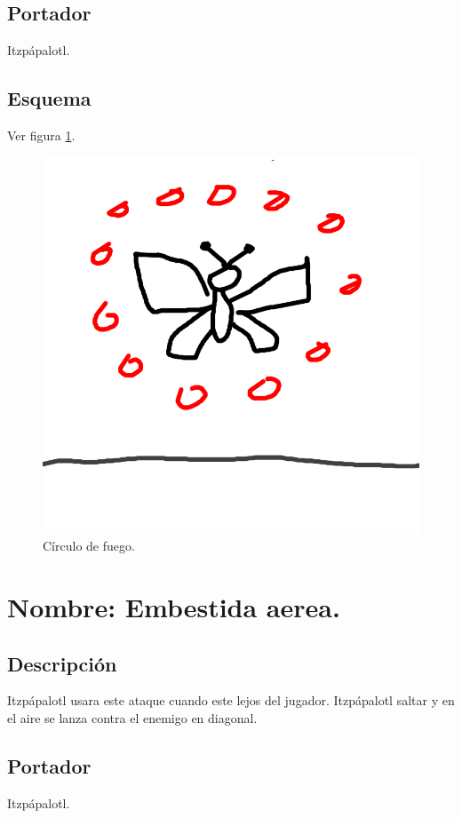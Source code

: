 \subsection{Portador}
Itzpápalotl. 
\subsection{Esquema}
			Ver figura \ref{fig:circuloF}.
			\begin{figure}
				\centering
				\includegraphics[height=0.2 \textheight]{Imagenes/circuloF}
				\caption{Círculo de fuego.}
				\label{fig:circuloF}
			\end{figure}
			
\section{Nombre: Embestida aerea.}\label{hab.EmbesAer}
\subsection{Descripción}
Itzpápalotl usara este ataque cuando este lejos del jugador. Itzpápalotl saltar y en el aire se lanza contra el enemigo en diagonal.
\subsection{Portador}
Itzpápalotl.
